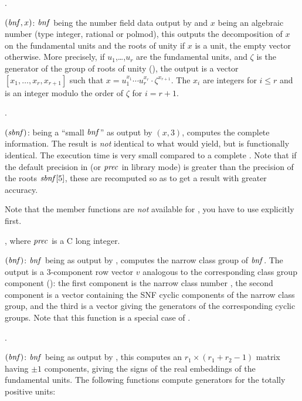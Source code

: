 .

$(\hbox{\it bnf\/},x)$: $\hbox{\it bnf\/}$ being the number field data
output by  and $x$ being an algebraic number (type integer,
rational or polmod), this outputs the decomposition of $x$ on the fundamental
units and the roots of unity if $x$ is a unit, the empty vector otherwise.
More precisely, if $u_1$,\dots,$u_r$ are the fundamental units, and $\zeta$
is the generator of the group of roots of unity (), the output is
a vector $[x_1,\dots,x_r,x_{r+1}]$ such that $x=u_1^{x_1}\cdots
u_r^{x_r}\cdot\zeta^{x_{r+1}}$. The $x_i$ are integers for $i\le r$ and is an
integer modulo the order of $\zeta$ for $i=r+1$.

.

$(\hbox{\it sbnf\/})$:  being a ``small $\hbox{\it bnf\/}$''
as output by $(x,3)$, computes the complete 
information. The result is \emph{not} identical to what  would
yield, but is functionally identical. The execution time is very small
compared to a complete . Note that if the default precision in
 (or $\hbox{\it prec\/}$ in library mode) is greater than the precision of the
roots $\hbox{\it sbnf\/}[5]$, these are recomputed so as to get a result with
greater accuracy.

Note that the member functions are \emph{not} available for , you
have to use  explicitly first.

, where $\hbox{\it prec\/}$ is a
C long integer.

$(\hbox{\it bnf\/})$: $\hbox{\it bnf\/}$ being as output by
, computes the narrow class group of $\hbox{\it bnf\/}$. The output is
a 3-component row vector $v$ analogous to the corresponding class group
component  (): the first component
is the narrow class number , the second component is a vector
containing the SNF cyclic components  of
the narrow class group, and the third is a vector giving the generators of
the corresponding  cyclic groups. Note that this function is a
special case of .

.

$(\hbox{\it bnf\/})$: $\hbox{\it bnf\/}$ being as output by
, this computes an $r_1\times(r_1+r_2-1)$ matrix having $\pm1$
components, giving the signs of the real embeddings of the fundamental units.
The following functions compute generators for the totally positive units:

